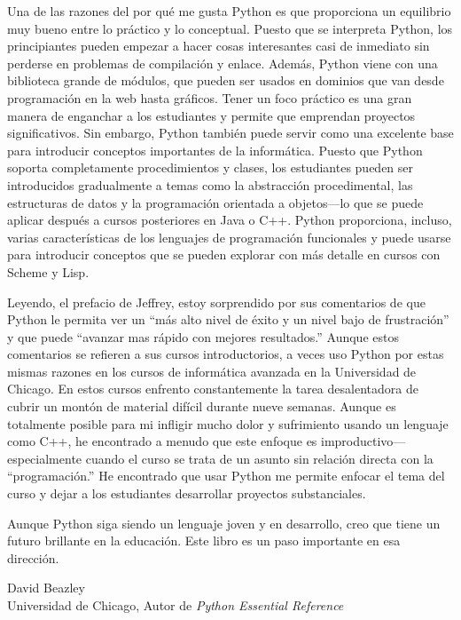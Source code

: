 Una de las razones del por qué me gusta Python es que proporciona un equilibrio muy
bueno entre lo práctico y lo conceptual.  Puesto que se interpreta Python,
los principiantes pueden  empezar a hacer cosas
interesantes casi de inmediato sin perderse en problemas de compilación
y enlace.  Además, Python viene con una biblioteca grande de
módulos, que pueden ser usados  en dominios que van 
desde programación en la web hasta gráficos.  Tener un foco práctico es
una gran manera de enganchar a los estudiantes y permite que emprendan proyectos
significativos.  Sin embargo, Python también puede servir como una
excelente base  para introducir conceptos importantes de la
informática. Puesto que Python soporta completamente procedimientos y
clases, los estudiantes pueden ser introducidos gradualmente a temas como la 
abstracción procedimental, las estructuras de datos y la programación orientada a objetos---lo 
que se puede aplicar después a cursos posteriores en Java o C++.  Python
proporciona, incluso, varias características de los  lenguajes de
programación funcionales y puede usarse para introducir conceptos que se pueden
explorar con más detalle en cursos con Scheme y Lisp.

Leyendo, el prefacio de Jeffrey, estoy sorprendido por sus comentarios de que
Python le permita ver un ``más alto nivel de éxito y un nivel bajo de
frustración'' y que puede  ``avanzar mas rápido con mejores resultados.''
Aunque estos comentarios se refieren a sus cursos introductorios, a veces uso
Python por estas mismas razones en los cursos de informática avanzada en 
la Universidad de Chicago.  En estos cursos enfrento constantemente la
tarea desalentadora de cubrir un montón de material difícil durante 
nueve semanas.  Aunque es totalmente posible para mi 
infligir mucho dolor y sufrimiento usando un lenguaje como C++, he encontrado a
menudo que este enfoque es improductivo---especialmente cuando el curso se trata de un asunto 
sin relación directa con la ``programación.''  He encontrado  que usar Python
me permite enfocar el tema del curso y dejar a los estudiantes desarrollar proyectos substanciales.

Aunque Python siga siendo un lenguaje joven y en desarrollo, creo que tiene un futuro brillante 
en la educación.  Este libro es un paso importante en esa dirección.

\vspace{0.25in}
\begin{flushleft}
David Beazley \\
Universidad de Chicago, Autor de {\em Python Essential Reference} 
\end{flushleft}

